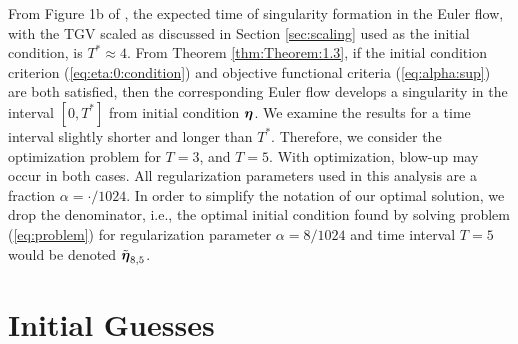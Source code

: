 From Figure 1b of \cite{bustamante_interplay_2012}, the expected time of singularity formation in the Euler flow, with the TGV scaled as discussed in Section \ref{sec:scaling} used as the initial condition, is $T^*\approx 4$. From Theorem \ref{thm:Theorem:1.3}, if the initial condition criterion (\ref{eq:eta:0:condition}) and objective functional criteria (\ref{eq:alpha:sup}) are both satisfied, then the corresponding Euler flow develops a singularity in the interval $[0,T^*]$ from initial condition ${\boldsymbol \eta}$. We examine the results for a time interval slightly shorter and longer than $T^*$. Therefore, we consider the optimization problem for $T=3$, and $T=5$. With optimization, blow-up may occur in both cases. {\color{red}All regularization parameters used in this analysis are a fraction $\alpha=\cdot/1024$. In order to simplify the notation of our optimal solution, we drop the denominator, i.e., the optimal initial condition found by solving problem (\ref{eq:problem}) for regularization parameter $\alpha=8/1024$ and time interval $T=5$ would be denoted $\tilde{{\boldsymbol \eta}}_{8,5}$.}

\section{Initial Guesses}

